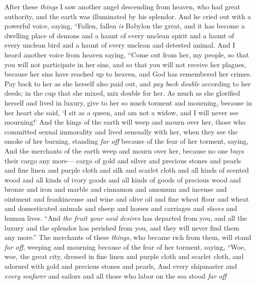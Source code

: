 \begin{biblechapter} %
 After these \textit{things} I saw another angel descending from heaven, who had great authority, and the earth was illuminated by his splendor.
\verse And he cried out with a powerful voice, saying,
\verse “Fallen, fallen \textit{is} Babylon the great, 
and it has become a dwelling place of demons 
and a haunt of every unclean spirit 
and a haunt of every unclean bird 
and a haunt of every unclean and detested animal.
\verse And I heard another voice from heaven saying,
\verse “Come out from her, my people, 
so that you will not participate in her sins, 
and so that you will not receive her plagues,
\verse because her sins have reached up to heaven, 
and God has remembered her crimes.
\verse Pay back to her as she herself also paid out, 
and \textit{pay back double} according to her deeds; 
in the cup that she mixed, mix double for her.
\verse As much as she glorified herself and lived in luxury, 
give to her so much torment and mourning, 
because in her heart she said, 
‘I sit as a queen, and am not a widow, 
and I will never see mourning!’
\verse And the kings of the earth will weep and mourn over her, those who committed sexual immorality and lived sensually with her, when they see the smoke of her burning,
\verse standing \textit{far off} because of the fear of her torment, saying,
\verse And the merchants of the earth weep and mourn over her, because no one buys their cargo any more—
\verse cargo of gold and silver and precious stones and pearls and fine linen and purple cloth and silk and scarlet cloth and all kinds of scented wood and all kinds of ivory goods and all kinds of goods of precious wood and bronze and iron and marble
\verse and cinnamon and amomum and incense and ointment and frankincense and wine and olive oil and fine wheat flour and wheat and domesticated animals and sheep and horses and carriages and \textit{slaves} and human lives.
\verse “And \textit{the fruit your soul desires} has departed from you, 
and all the luxury and the splendor has perished from you, 
and they will never find them any more.”
\verse The merchants of these \textit{things}, who became rich from them, will stand \textit{far off}, weeping and mourning because of the fear of her torment,
\verse saying,
\verse “Woe, woe, the great city, 
dressed in fine linen and purple cloth and scarlet cloth, 
and adorned with gold and precious stones and pearls,
\verse And every shipmaster and \textit{every seafarer} and sailors and all those who labor on the sea stood \textit{far off}

\end{biblechapter}
